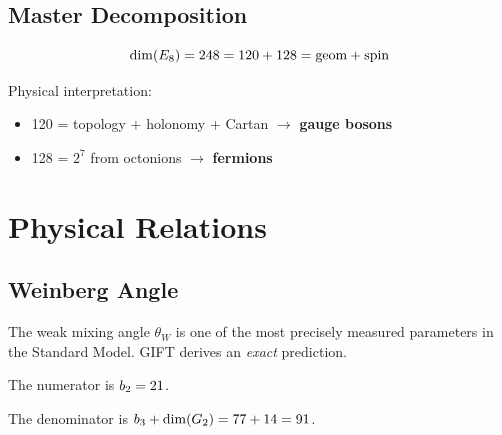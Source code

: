 \section{Master Decomposition}

\begin{theorem}[E8 = SO(16) + Spinor]\label{thm:E8_SO16_decomposition}
    \leanok
    \[
        \mathrm{dim}(E_8) = 248 = 120 + 128 = \mathrm{geom} + \mathrm{spin}
    \]
\end{theorem}

\begin{theorem}\label{thm:gauge_fermion_split}
    \leanok
    Physical interpretation:
    \begin{itemize}
        \item 120 = topology + holonomy + Cartan $\to$ \textbf{gauge bosons}
        \item 128 = $2^7$ from octonions $\to$ \textbf{fermions}
    \end{itemize}
\end{theorem}

\chapter{Physical Relations}\label{chap:relations}

\section{Weinberg Angle}

The weak mixing angle $\theta_W$ is one of the most precisely measured parameters
in the Standard Model. GIFT derives an \emph{exact} prediction.

\begin{definition}\label{def:weinberg_num}
    \leanok
    The numerator is $b_2 = 21$.
\end{definition}

\begin{definition}\label{def:weinberg_den}
    \leanok
    The denominator is $b_3 + \mathrm{dim}(G_2) = 77 + 14 = 91$.
\end{definition}

